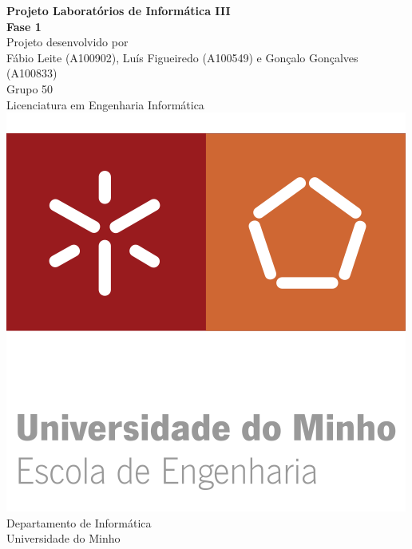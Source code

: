 \documentclass[12pt,a4paper]{report}
\begin{document}
\begin{titlepage}
    {\centering
        {
        \LARGE{\textbf{Projeto Laboratórios de Informática III\\Fase 1}} \\ 
        \vspace*{\fill} 
        {\large{Projeto desenvolvido por}} \\
        \vspace{10pt}
        \small{ Fábio  Leite (A100902),  Luís Figueiredo (A100549) e Gonçalo Gonçalves (A100833) } \\
        \vspace{10pt}
        {\large{Grupo 50}}
        \vspace*{\fill} \\
        {\Large Licenciatura em Engenharia Informática} \\
        \vspace*{\fill}
        \includegraphics[scale=1.25]{eeng.png} \\ [0.5cm]
        {\large Departamento de Informática \\ Universidade do Minho} \\
        }
    }
\end{titlepage}

\newpage

    \tableofcontents
\end{document}
